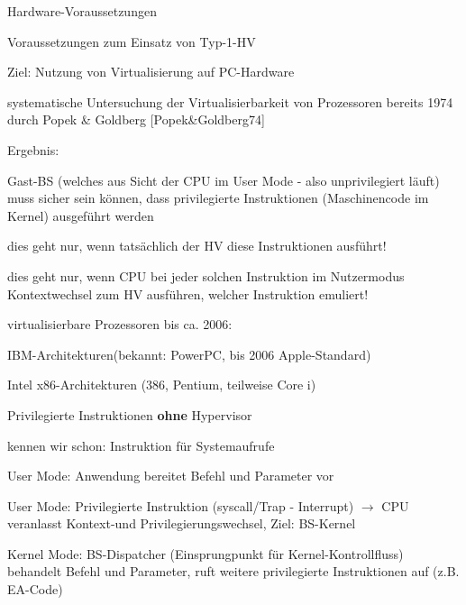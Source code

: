 \documentclass[a4paper]{article}
\newcommand{\cmark}{\ding{51}}
\newcommand{\xmark}{\ding{55}}
\begin{document}
\begin{multicols}{3}
    Hardware-Voraussetzungen

    \begin{itemize*}
        \item
        Voraussetzungen zum Einsatz von Typ-1-HV
        \begin{itemize*}
            \item Ziel: Nutzung von Virtualisierung auf PC-Hardware
            \item systematische Untersuchung der Virtualisierbarkeit von Prozessoren bereits 1974 durch Popek \& Goldberg {[}Popek\&Goldberg74{]}
            \item Ergebnis: \begin{itemize*} \item Gast-BS (welches aus Sicht der CPU im User Mode - also unprivilegiert läuft) muss sicher sein können, dass privilegierte Instruktionen (Maschinencode im Kernel) ausgeführt werden \item dies geht nur, wenn tatsächlich der HV diese Instruktionen ausführt! \item dies geht nur, wenn CPU bei jeder solchen Instruktion im Nutzermodus Kontextwechsel zum HV ausführen, welcher Instruktion emuliert! \end{itemize*}
        \end{itemize*}
        \item
        virtualisierbare Prozessoren bis ca. 2006:
        \begin{itemize*}
            \item \cmark IBM-Architekturen(bekannt: PowerPC, bis 2006 Apple-Standard)
            \item \xmark Intel x86-Architekturen (386, Pentium, teilweise Core i)
        \end{itemize*}
    \end{itemize*}

    Privilegierte Instruktionen \textbf{ohne} Hypervisor

    \begin{itemize*}
        \item
        kennen wir schon: Instruktion für Systemaufrufe
    \end{itemize*}

    \begin{enumerate*}
        \item
        User Mode: Anwendung bereitet Befehl und Parameter vor
        \item
        User Mode: Privilegierte Instruktion (syscall/Trap - Interrupt)
        $\rightarrow$ CPU veranlasst Kontext-und
        Privilegierungswechsel, Ziel: BS-Kernel
        \item
        Kernel Mode: BS-Dispatcher (Einsprungpunkt für Kernel-Kontrollfluss)
        behandelt Befehl und Parameter, ruft weitere privilegierte
        Instruktionen auf (z.B. EA-Code)
    \end{enumerate*}


\end{multicols}
\end{document}
